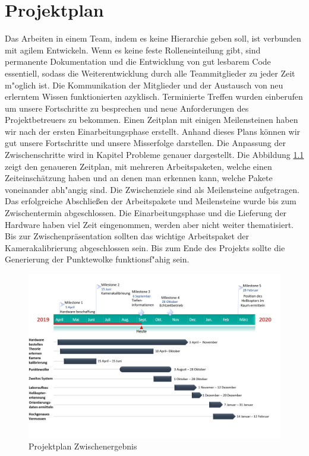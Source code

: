 \chapter{Projektplan}
\label{cha:projektplan}

Das Arbeiten in einem Team, indem es keine Hierarchie geben soll, ist verbunden mit agilem Entwickeln. Wenn es keine feste Rolleneinteilung gibt, sind permanente Dokumentation und die Entwicklung von gut lesbarem Code essentiell, sodass die Weiterentwicklung durch alle Teammitglieder zu jeder Zeit m"oglich ist. Die Kommunikation der Mitglieder und der Austausch von neu erlerntem Wissen funktionierten azyklisch. Terminierte Treffen wurden einberufen um unsere Fortschritte zu besprechen und neue Anforderungen des Projektbetreuers zu bekommen. Einen Zeitplan mit einigen Meilensteinen haben wir nach der ersten Einarbeitungsphase erstellt. Anhand dieses Plans können wir gut unsere Fortschritte und unsere Misserfolge darstellen. Die Anpassung der Zwischenschritte wird in Kapitel Probleme genauer dargestellt.\newline
Die Abbildung \ref{fig:ms1} zeigt den genaueren Zeitplan, mit mehreren Arbeitspaketen, welche einen Zeiteinschätzung haben und an denen man erkennen kann, welche Pakete voneinander abh"angig sind. Die Zwischenziele sind als Meilensteine aufgetragen. Das erfolgreiche Abschließen der Arbeitspakete und Meilensteine wurde bis zum Zwischentermin abgeschlossen. Die Einarbeitungsphase und die Lieferung der Hardware haben viel Zeit eingenommen, werden aber nicht weiter thematisiert. Bis zur Zwischenpräsentation sollten das wichtige Arbeitspaket der Kamerakalibrierung abgeschlossen sein. Bis zum Ende des Projekts sollte die Generierung der Punktewolke funktionsf"ahig sein.

\begin{figure}[H]
	\includegraphics[scale=0.36]{bilder/ms1}
	\caption[Projektplan Zwischenergebnis]{Projektplan Zwischenergebnis}
	\label{fig:ms1}
\end{figure}

